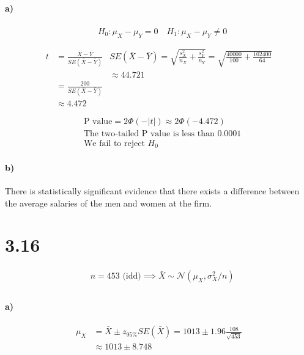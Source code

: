 \documentclass[letterpaper,12pt,titlepage,oneside,final]{book}
\begin{document}
\paragraph{a)}
\begin{align*}
&H_0: \mu_X - \mu_Y = 0 \quad H_1: \mu_X - \mu_Y\neq 0\\
\\
\end{align*}
\begin{align*}
t& = \frac{\bar{X}-\bar{Y}}{SE(\bar{X}-\bar{Y})} &SE(\bar{X}-\bar{Y})= \sqrt{\frac{s_X^2}{n_X}+\frac{s_Y^2}{n_Y}} = \sqrt{\frac{40000}{100}+\frac{102400}{64}} \\
&&\approx 44.721\\
&=\frac{200}{SE(\bar{X}-\bar{Y})}\\
&\approx 4.472\\
\\
\end{align*}
\begin{align*}
&\text{P value} =2\Phi(-|t|) \approx 2\Phi(-4.472)\\
&\text{The two-tailed P value is less than 0.0001}\\
&\text{We fail to reject }H_0
\end{align*}
\paragraph{b)} There is statistically significant evidence that there exists a difference between the average salaries of the men and women at the firm.

\section*{3.16}
\begin{align*}
&n= 453\text{ (idd)} \implies \bar{X}\sim \mathcal{N}(\mu_X, \sigma^2_{X}/n)\\
\end{align*}
\paragraph{a)}
\begin{align*}
\mu_X& = \bar{X}\pm z_{95\%}SE(\bar{X})= 1013\pm 1.96\frac{108}{\sqrt{453}}\\
&\approx 1013 \pm 8.748
\end{align*}
\end{document}
